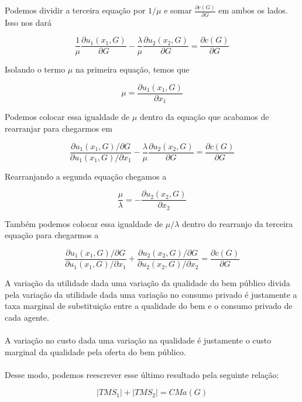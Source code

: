 \documentclass[a4paper,11pt,oneside]{book}
\theoremstyle{definition}
\theoremstyle{break}
\begin{document}
Podemos dividir a terceira equação por $1/\mu$ e somar $\frac{\partial c(G)}{\partial G}$ em ambos os lados. Isso nos dará 

$$ \frac{1}{\mu} \frac{\partial u_1(x_1,G)}{\partial G} - \frac{\lambda}{\mu} \frac{\partial u_2(x_2,G)}{\partial G} = \frac{\partial c(G)}{\partial G} $$

Isolando o termo $\mu$ na primeira equação, temos que

$$ \mu = \frac{\partial u_1(x_1,G)}{\partial x_1} $$

Podemos colocar essa igualdade de $\mu$ dentro da equação que acabamos de rearranjar para chegarmos em

$$ \frac{\partial u_1(x_1,G) / \partial G}{\partial u_1(x_1,G) / \partial x_1} - \frac{\lambda}{\mu} \frac{\partial u_2(x_2,G)}{\partial G} = \frac{\partial c(G)}{\partial G} $$

Rearranjando a segunda equação chegamos a 

$$ \frac{\mu}{\lambda} = - \frac{\partial u_2(x_2,G)}{\partial x_2} $$

Também podemos colocar essa igualdade de $\mu / \lambda$ dentro do rearranjo da terceira equação para chegarmos a

$$ \frac{\partial u_1(x_1,G) / \partial G}{\partial u_1(x_1,G) / \partial x_1} +  \frac{\partial u_2(x_2,G) / \partial G}{\partial u_2(x_2,G) / \partial x_2} = \frac{\partial c(G)}{\partial G} $$

A variação da utilidade dada uma variação da qualidade do bem público divida pela variação da utilidade dada uma variação no consumo privado é justamente a taxa marginal de substituição entre a qualidade do bem e o consumo privado de cada agente.
\\~\\
A variação no custo dada uma variação na qualidade é justamente o custo marginal da qualidade pela oferta do bem público.
\\~\\
Desse modo, podemos reescrever esse último resultado pela seguinte relação:

$$ |TMS_1| + |TMS_2| =  CMa(G) $$
\end{document}
